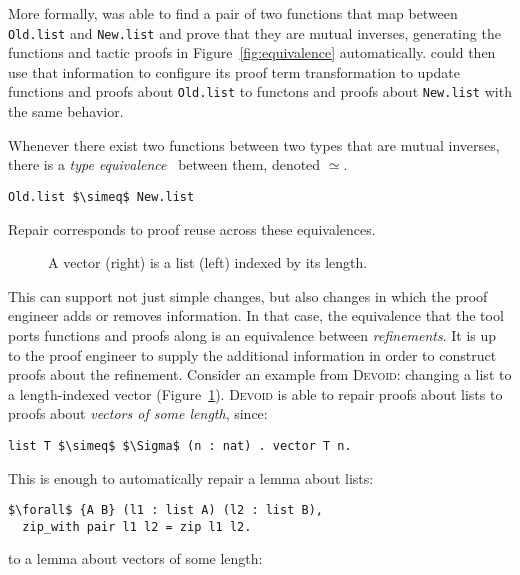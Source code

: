 More formally, \toolname was able to find a pair of two functions that map between \lstinline{Old.list}
and \lstinline{New.list} and prove that they are mutual inverses, generating the functions and tactic
proofs in Figure~\ref{fig:equivalence} automatically.
\toolname could then use that information to configure its proof term transformation to update
functions and proofs about \lstinline{Old.list} to functons and proofs about \lstinline{New.list} with
the same behavior.

Whenever there exist two functions between two types that are mutual inverses,
there is a \textit{type equivalence}~\cite{univalent2013homotopy} between them, denoted $\simeq$.

\begin{lstlisting}
Old.list $\simeq$ New.list
\end{lstlisting}
Repair corresponds to proof reuse across these equivalences.

\begin{figure}
\begin{minipage}{0.40\textwidth}
   
\end{minipage}
\hfill
\begin{minipage}{0.58\textwidth}
   
\end{minipage}
\caption{A vector (right) is a list (left) indexed by its length.}
\label{fig:listtovect}
\end{figure}

This can support not just simple changes, but also changes in which the proof engineer adds or removes information.
In that case, the equivalence that the tool ports functions and proofs along
is an equivalence between \textit{refinements}.
It is up to the proof engineer to supply the additional information in order to construct proofs about the refinement.
Consider an example from \textsc{Devoid}: changing a list to a length-indexed vector (Figure~\ref{fig:listtovect}).
\textsc{Devoid} is able to repair proofs about lists to proofs about \textit{vectors of some length}, since:

\begin{lstlisting}
list T $\simeq$ $\Sigma$ (n : nat) . vector T n.
\end{lstlisting}
This is enough to automatically repair a lemma about lists:

\begin{lstlisting}
$\forall$ {A B} (l1 : list A) (l2 : list B),
  zip_with pair l1 l2 = zip l1 l2.
\end{lstlisting}
to a lemma about vectors of some length:

